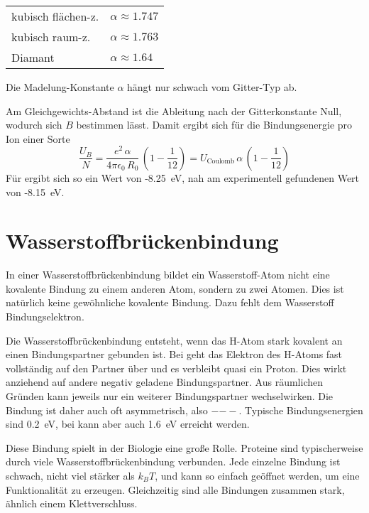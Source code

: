 \begin{marginfigure}

\begin{tabular}{ll}
kubisch flächen-z. & $\alpha \approx 1.747$ \\
kubisch raum-z. & $\alpha \approx 1.763$ \\
Diamant & $\alpha \approx 1.64$ \\
\end{tabular}
\caption{Die Madelung-Konstante $\alpha$ hängt nur schwach vom Gitter-Typ ab.}
\end{marginfigure}

Am Gleichgewichts-Abstand ist die Ableitung nach der Gitterkonstante Null, wodurch sich $B$ bestimmen lässt. Damit ergibt sich für die Bindungsenergie pro Ion einer Sorte
\begin{equation}
\frac{U_B}{N} = \frac{e^2 \, \alpha }{4 \pi \epsilon_0 \, R_0} \, \left( 1- \frac{1}{12} \right) = U_\text{Coulomb} \, \alpha \, \left( 1- \frac{1}{12} \right) 
\end{equation}
Für  ergibt sich so ein Wert von -8.25~eV, nah am experimentell gefundenen Wert von -8.15~eV.





\section{Wasserstoffbrückenbindung}

In einer Wasserstoffbrückenbindung bildet ein Wasserstoff-Atom nicht eine kovalente Bindung zu einem anderen Atom, sondern zu zwei Atomen. Dies ist natürlich keine gewöhnliche kovalente Bindung. Dazu fehlt dem Wasserstoff  Bindungselektron.

Die Wasserstoffbrückenbindung entsteht, wenn das H-Atom stark kovalent an einen Bindungspartner gebunden ist. Bei geht das Elektron des H-Atoms fast vollständig auf den Partner über und es verbleibt quasi ein Proton. Dies wirkt anziehend auf andere negativ geladene Bindungspartner. Aus räumlichen Gründen kann jeweils nur ein weiterer Bindungspartner wechselwirken. Die Bindung ist daher auch oft asymmetrisch, also $-$$--$. Typische Bindungsenergien sind 0.2~eV, bei  kann aber auch 1.6~eV erreicht werden.

Diese Bindung spielt in der Biologie eine große Rolle. Proteine sind typischerweise durch viele Wasserstoffbrückenbindung verbunden. Jede einzelne Bindung ist schwach, nicht viel stärker als $k_B T$, und kann so einfach geöffnet werden, um eine Funktionalität zu erzeugen. Gleichzeitig sind alle Bindungen zusammen stark, ähnlich einem Klettverschluss.

